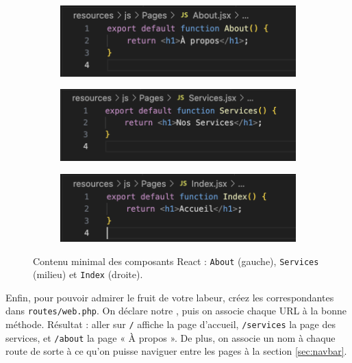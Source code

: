 \begin{figure}[H]
    \centering
    \begin{subfigure}[b]{0.31\textwidth}
        \centering
        \includegraphics[width=\textwidth]{figures-C1/about_ini.png}
    \end{subfigure}
    \begin{subfigure}[b]{0.31\textwidth}
        \centering
        \includegraphics[width=\textwidth]{figures-C1/services_ini.png}
    \end{subfigure}
    \begin{subfigure}[b]{0.31\textwidth}
        \centering
        \includegraphics[width=\textwidth]{figures-C1/index_ini.png}
    \end{subfigure}
    \caption{Contenu minimal des composants React : \texttt{About} (gauche), \texttt{Services} (milieu) et \texttt{Index} (droite).}
\end{figure}

Enfin, pour pouvoir admirer le fruit de votre labeur, créez les \routes{} correspondantes dans \verb|routes/web.php|.  
On déclare notre \controller{}, puis on associe chaque URL à la bonne méthode. Résultat : aller sur \verb|/| affiche la page d'accueil, \verb|/services| la page des services, et \verb|/about| la page « À propos ». De plus, on associe un nom à chaque route de sorte à ce qu'on puisse naviguer entre les pages à la section \ref{sec:navbar}.

